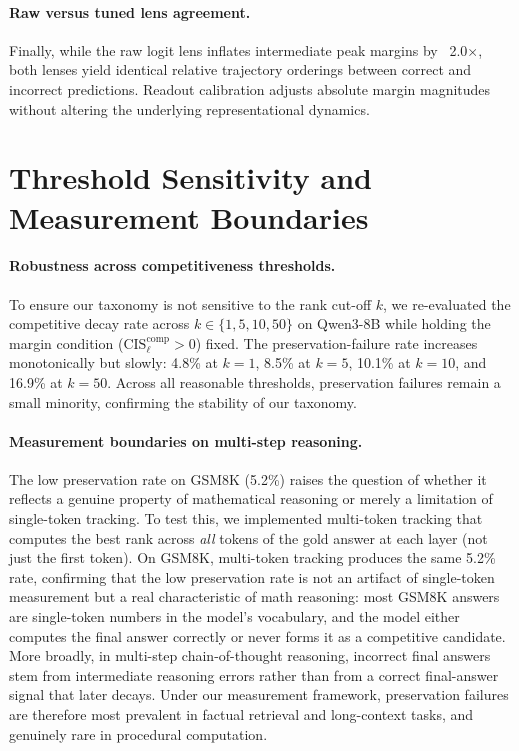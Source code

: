 \documentclass{article} %
\begin{document}
\paragraph{Raw versus tuned lens agreement.}
Finally, while the raw logit lens inflates intermediate peak margins by ~2.0$\times$, both lenses yield identical relative trajectory orderings between correct and incorrect predictions. Readout calibration adjusts absolute margin magnitudes without altering the underlying representational dynamics.

\section{Threshold Sensitivity and Measurement Boundaries}
\label{app:thresholds}

\paragraph{Robustness across competitiveness thresholds.}
To ensure our taxonomy is not sensitive to the rank cut-off $k$, we re-evaluated the competitive decay rate across $k \in \{1, 5, 10, 50\}$ on Qwen3-8B while holding the margin condition ($\mathrm{CIS}^{\mathrm{comp}}_\ell > 0$) fixed. The preservation-failure rate increases monotonically but slowly: 4.8\% at $k=1$, 8.5\% at $k=5$, 10.1\% at $k=10$, and 16.9\% at $k=50$. Across all reasonable thresholds, preservation failures remain a small minority, confirming the stability of our taxonomy.

\paragraph{Measurement boundaries on multi-step reasoning.}
The low preservation rate on GSM8K (5.2\%) raises the question of whether it reflects a genuine property of mathematical reasoning or merely a limitation of single-token tracking. To test this, we implemented multi-token tracking that computes the best rank across \emph{all} tokens of the gold answer at each layer (not just the first token). On GSM8K, multi-token tracking produces the same 5.2\% rate, confirming that the low preservation rate is not an artifact of single-token measurement but a real characteristic of math reasoning: most GSM8K answers are single-token numbers in the model's vocabulary, and the model either computes the final answer correctly or never forms it as a competitive candidate. More broadly, in multi-step chain-of-thought reasoning, incorrect final answers stem from intermediate reasoning errors rather than from a correct final-answer signal that later decays. Under our measurement framework, preservation failures are therefore most prevalent in factual retrieval and long-context tasks, and genuinely rare in procedural computation.
\end{document}
